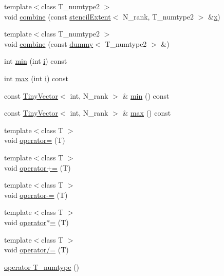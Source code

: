 \begin{DoxyCompactItemize}
\item 
{\footnotesize template$<$class T\+\_\+numtype2 $>$ }\\void \hyperlink{classstencilExtent_a389ef499ff977cd822b6a8a5bd56b277}{combine} (const \hyperlink{classstencilExtent}{stencil\+Extent}$<$ N\+\_\+rank, T\+\_\+numtype2 $>$ \&\hyperlink{vecnorm1_8cc_ac73eed9e41ec09d58f112f06c2d6cb63}{x})
\item 
{\footnotesize template$<$class T\+\_\+numtype2 $>$ }\\void \hyperlink{classstencilExtent_a4631c0622589ac3dea11bdbe6e43d2d1}{combine} (const \hyperlink{classdummy}{dummy}$<$ T\+\_\+numtype2 $>$ \&)
\item 
int \hyperlink{classstencilExtent_a99c139ee02c3f19874df474c0cfaa681}{min} (int \hyperlink{indexexpr_8h_aabd77643995707c185e95c8cb2782c81}{i}) const 
\item 
int \hyperlink{classstencilExtent_a96ac8cf95f713941ca635655bbba9f94}{max} (int \hyperlink{indexexpr_8h_aabd77643995707c185e95c8cb2782c81}{i}) const 
\item 
const \hyperlink{classTinyVector}{Tiny\+Vector}$<$ int, N\+\_\+rank $>$ \& \hyperlink{classstencilExtent_a2350988a0e56145caaa163eb87d6a844}{min} () const 
\item 
const \hyperlink{classTinyVector}{Tiny\+Vector}$<$ int, N\+\_\+rank $>$ \& \hyperlink{classstencilExtent_a0ba2ff945ff6788eaf8b21f5e5731040}{max} () const 
\item 
{\footnotesize template$<$class T $>$ }\\void \hyperlink{classstencilExtent_acce3a75a178dfbafa2c2e1aab59683b5}{operator=} (T)
\item 
{\footnotesize template$<$class T $>$ }\\void \hyperlink{classstencilExtent_a3404e13e13c5b27dd0351e4f75bb5008}{operator+=} (T)
\item 
{\footnotesize template$<$class T $>$ }\\void \hyperlink{classstencilExtent_ac4b7ed6ea793099c18995839e96b94aa}{operator-\/=} (T)
\item 
{\footnotesize template$<$class T $>$ }\\void \hyperlink{classstencilExtent_a5fa7744d8046be098dd325650439996e}{operator$\ast$=} (T)
\item 
{\footnotesize template$<$class T $>$ }\\void \hyperlink{classstencilExtent_a3ff1b5731685269e856a4584e0ca4efa}{operator/=} (T)
\item 
\hyperlink{classstencilExtent_a7bbb6bcc71f47aaa75d875f848a66ca6}{operator T\+\_\+numtype} ()

\end{DoxyCompactItemize}
